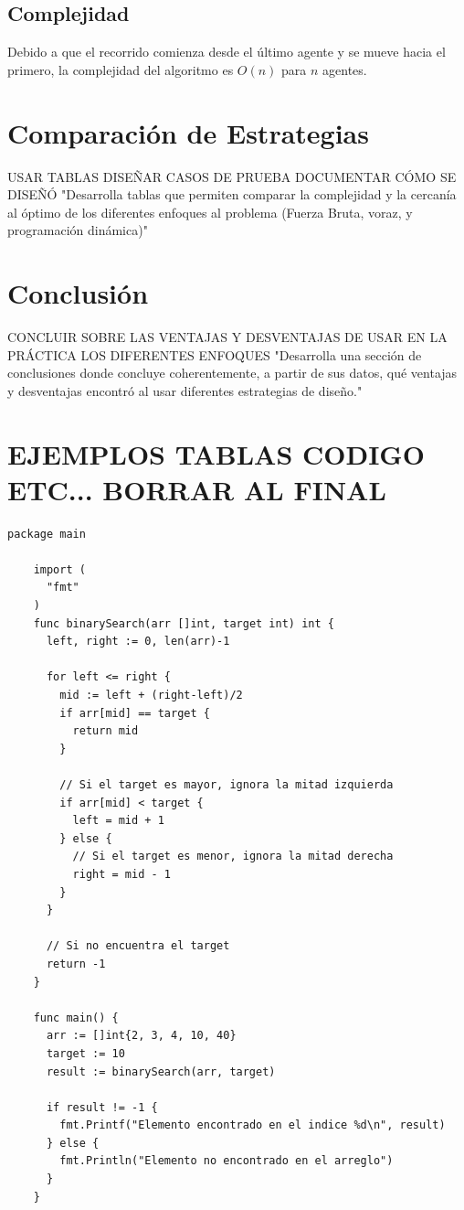 \documentclass[letterpaper,10pt]{article}
\begin{document}
\subsection{Complejidad}
Debido a que el recorrido comienza desde el último agente y se mueve hacia el primero, la complejidad del algoritmo es $O(n)$ para $n$ agentes.
\label{subsec:complejidad_programacion_dinamica}
\section{Comparación de Estrategias}
\label{sec:comparacion_estrategias}
USAR TABLAS DISEÑAR CASOS DE PRUEBA DOCUMENTAR CÓMO SE DISEÑÓ
"Desarrolla tablas que permiten comparar la complejidad y la cercanía al óptimo de los diferentes enfoques al problema (Fuerza Bruta, voraz, y programación dinámica)"

\section{Conclusión}
\label{sec:conclusion}
CONCLUIR SOBRE LAS VENTAJAS Y DESVENTAJAS DE USAR EN LA PRÁCTICA LOS DIFERENTES ENFOQUES
"Desarrolla una sección de conclusiones donde concluye coherentemente, a partir de sus datos, qué ventajas y desventajas encontró al usar diferentes estrategias de diseño."
\section{EJEMPLOS TABLAS CODIGO ETC... BORRAR AL FINAL}
\begin{lstlisting}[caption={Algoritmo de búsqueda binaria en Go}, label={lst:binary_search}]
    package main
    
    import (
      "fmt"
    )
    func binarySearch(arr []int, target int) int {
      left, right := 0, len(arr)-1
      
      for left <= right {
        mid := left + (right-left)/2
        if arr[mid] == target {
          return mid
        }
        
        // Si el target es mayor, ignora la mitad izquierda
        if arr[mid] < target {
          left = mid + 1
        } else {
          // Si el target es menor, ignora la mitad derecha
          right = mid - 1
        }
      }
      
      // Si no encuentra el target
      return -1
    }
    
    func main() {
      arr := []int{2, 3, 4, 10, 40}
      target := 10
      result := binarySearch(arr, target)
      
      if result != -1 {
        fmt.Printf("Elemento encontrado en el indice %d\n", result)
      } else {
        fmt.Println("Elemento no encontrado en el arreglo")
      }
    }
\end{lstlisting}
\end{document}
